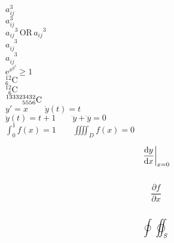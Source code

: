 \documentclass[]{article}
\begin{document}
	
	
	$a^3_{ij}$ \\
	
	$a_{ij}^3$ \\
	
	${a_{ij}}^3 \, \text{OR} \, a_{ij}{}^3$ \\
	
	$a^{\phantom{ij}3}_{ij}$ \\
	
	$a^{\phantom{ij}3}_{ij}$ \\
	
	$\mathrm{e}^{x^{y^3}} \geq 1 $ \\
	
	$ {}_{6}^{12}\mathrm{C} $ \\
	
	$ {}_{\phantom{1}6}^{12}\mathrm{C} $ \\ %
	
	$\prescript{133323432}{5556}{\mathrm{C}}$ \\
	
	
	$y'=x \qquad \dot{y}(t)=t $ \\
	
	$\ddot{y}(t) = t + 1 \qquad \dddot{y} + \ddddot{y} = 0 $ \\
	
	$\int_{0}^{1}f(x) = 1 \qquad \iiiint_D f(x) = 0 $ \\
	
	\newcommand{\ud}{\mathop{}\negthinspace\mathrm{d}}
	
	\[
		\left.\frac{\ud y}{\ud x} \right |_{x=0}
	\] \\
	
	\[
		\frac{ \partial f } { \partial x}
	\] \\
	
	\[
		\oint \; \varoiint_S
	\] \\ %
	
\end{document}
